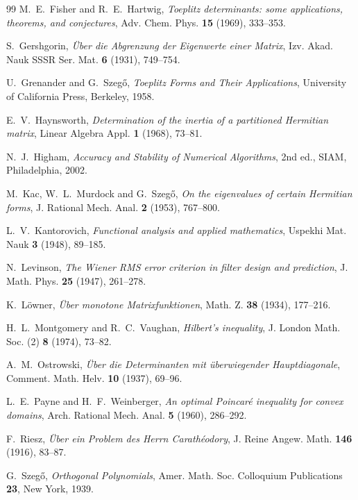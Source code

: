 \documentclass[11pt,a4paper]{article}
\theoremstyle{plain}
\theoremstyle{definition}
\begin{document}
\begin{thebibliography}{99}
 M.~E.~Fisher and R.~E.~Hartwig,
\emph{Toeplitz determinants: some applications, theorems, and conjectures},
Adv. Chem. Phys. \textbf{15} (1969), 333--353.

 S.~Gershgorin,
\emph{\"Uber die Abgrenzung der Eigenwerte einer Matrix},
Izv. Akad. Nauk SSSR Ser. Mat. \textbf{6} (1931), 749--754.

 U.~Grenander and G.~Szeg\H{o},
\emph{Toeplitz Forms and Their Applications},
University of California Press, Berkeley, 1958.

 E.~V.~Haynsworth,
\emph{Determination of the inertia of a partitioned Hermitian matrix},
Linear Algebra Appl. \textbf{1} (1968), 73--81.

 N.~J.~Higham,
\emph{Accuracy and Stability of Numerical Algorithms}, 2nd ed., SIAM,
Philadelphia, 2002.

 M.~Kac, W.~L.~Murdock and G.~Szeg\H{o},
\emph{On the eigenvalues of certain Hermitian forms},
J. Rational Mech. Anal. \textbf{2} (1953), 767--800.

 L.~V.~Kantorovich,
\emph{Functional analysis and applied mathematics},
Uspekhi Mat. Nauk \textbf{3} (1948), 89--185.

 N.~Levinson,
\emph{The Wiener RMS error criterion in filter design and prediction},
J. Math. Phys. \textbf{25} (1947), 261--278.

 K.~L\"owner,
\emph{\"Uber monotone Matrixfunktionen},
Math. Z. \textbf{38} (1934), 177--216.

 H.~L.~Montgomery and R.~C.~Vaughan,
\emph{Hilbert's inequality},
J. London Math. Soc. (2) \textbf{8} (1974), 73--82.

 A.~M.~Ostrowski,
\emph{\"Uber die Determinanten mit \"uberwiegender Hauptdiagonale},
Comment. Math. Helv. \textbf{10} (1937), 69--96.

 L.~E.~Payne and H.~F.~Weinberger,
\emph{An optimal Poincar\'e inequality for convex domains},
Arch. Rational Mech. Anal. \textbf{5} (1960), 286--292.

 F.~Riesz,
\emph{\"Uber ein Problem des Herrn Carath\'eodory},
J. Reine Angew. Math. \textbf{146} (1916), 83--87.

 G.~Szeg\H{o},
\emph{Orthogonal Polynomials},
Amer. Math. Soc. Colloquium Publications \textbf{23}, New York, 1939.


\end{thebibliography}
\end{document}
